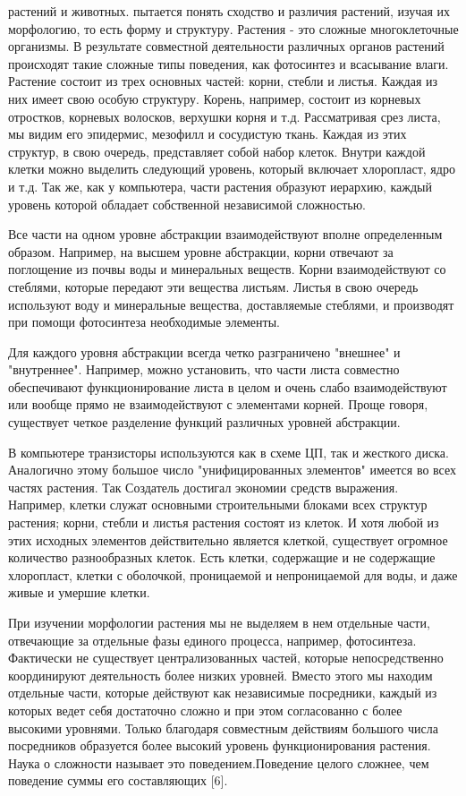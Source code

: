 \documentclass[11pt]{article}
\begin{document}
 растений и животных.  пытается понять сходство и различия растений, изучая их морфологию, то есть форму и структуру. Растения - это сложные многоклеточные организмы. В результате совместной деятельности различных органов растений происходят такие сложные типы поведения, как фотосинтез и всасывание влаги. 
Растение состоит из трех основных частей: корни, стебли и листья. Каждая из них имеет свою особую структуру. Корень, например, состоит из корневых отростков, корневых волосков, верхушки корня и т.д. Рассматривая срез листа, мы видим его эпидермис, мезофилл и сосудистую ткань. Каждая из этих структур, в свою очередь, представляет собой набор клеток. Внутри каждой клетки можно выделить следующий уровень, который включает хлоропласт, ядро и т.д. Так же, как у компьютера, части растения образуют иерархию, каждый уровень которой обладает собственной независимой сложностью. \bigskip 

Все части на одном уровне абстракции взаимодействуют вполне определенным образом. Например, на высшем уровне абстракции, корни отвечают за поглощение из почвы воды и минеральных веществ. Корни взаимодействуют со стеблями, которые передают эти вещества листьям. Листья в свою очередь используют воду и минеральные вещества, доставляемые стеблями, и производят при помощи фотосинтеза необходимые элементы. \bigskip 

Для каждого уровня абстракции всегда четко разграничено "внешнее" и "внутреннее". Например, можно установить, что части листа совместно обеспечивают функционирование листа в целом и очень слабо взаимодействуют или вообще прямо не взаимодействуют с элементами корней. Проще говоря, существует четкое разделение функций различных уровней абстракции. \bigskip 

В компьютере транзисторы используются как в схеме ЦП, так и жесткого диска. Аналогично этому большое число "унифицированных элементов" имеется во всех частях растения. Так Создатель достигал экономии средств выражения. Например, клетки служат основными строительными блоками всех структур растения; корни, стебли и листья растения состоят из клеток. И хотя любой из этих исходных элементов действительно является клеткой, существует огромное количество разнообразных клеток. Есть клетки, содержащие и не содержащие хлоропласт, клетки с оболочкой, проницаемой и непроницаемой для воды, и даже живые и умершие клетки. \bigskip 

При изучении морфологии растения мы не выделяем в нем отдельные части, отвечающие за отдельные фазы единого процесса, например, фотосинтеза. Фактически не существует централизованных частей, которые непосредственно координируют деятельность более низких уровней. Вместо этого мы находим отдельные части, которые действуют как независимые посредники, каждый из которых ведет себя достаточно сложно и при этом согласованно с более высокими уровнями. Только благодаря совместным действиям большого числа посредников образуется более высокий уровень функционирования растения. Наука о сложности называет это  поведением.\rm Поведение целого сложнее, чем поведение суммы его составляющих [6]. \bigskip 
\end{document}
